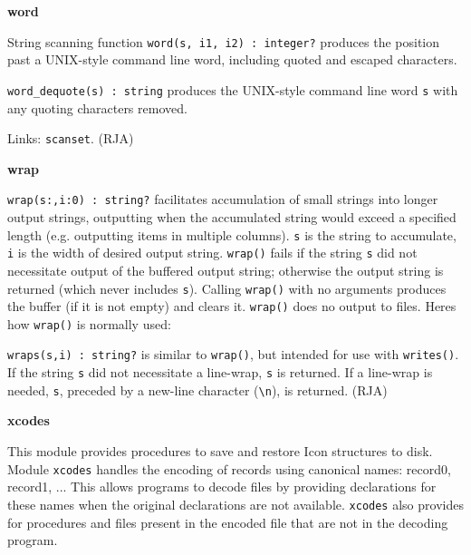 {\sffamily\bfseries
word}

String scanning function \texttt{word(s, i1, i2) : integer?} produces
the position past a UNIX-style command line word, including quoted and
escaped characters.

\texttt{word\_dequote(s) : string} produces the UNIX-style command line
word \texttt{s} with any quoting characters removed.

Links: \texttt{scanset}. (RJA)

{\sffamily\bfseries
wrap}

\texttt{wrap}\texttt{(s:{\textquotedbl}{\textquotedbl},i:0)
: string?} facilitates accumulation of small strings into longer output
strings, outputting when the accumulated string would exceed a
specified length (e.g. outputting items in multiple columns).
\texttt{s} is the string to accumulate, \texttt{i} is the width of
desired output string. \texttt{wrap()} fails if the string \texttt{s}
did not necessitate output of the buffered output string; otherwise the
output string is returned (which never includes \texttt{s}). Calling
\texttt{wrap()} with no arguments produces the buffer (if it is not
empty) and clears it. \texttt{wrap()} does no output to files.
Here{\textquotesingle}s how \texttt{wrap()} is normally used:


\texttt{wraps(s,i) : string?} is similar to \texttt{wrap()}, but
intended for use with \texttt{writes()}. If the string \texttt{s} did
not necessitate a line-wrap, \texttt{s} is returned. If a line-wrap is
needed, \texttt{s}, preceded by a new-line character
(\texttt{{\textquotedbl}{\textbackslash}n{\textquotedbl}}), is
returned. (RJA)

{\sffamily\bfseries
xcodes}

This module provides procedures to save and restore Icon structures to
disk. Module \texttt{xcodes} handles the encoding of
records using canonical names: record0, record1, ... This allows
programs to decode files by providing declarations for these names when
the original declarations are not available. \texttt{xcodes} also
provides for procedures and files present in the encoded file that are
not in the decoding program.

